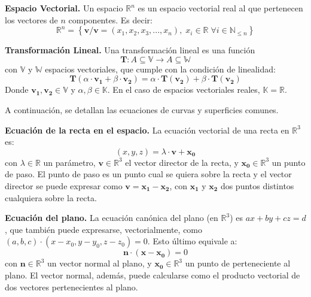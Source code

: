 \begin{definition}\textbf{Espacio Vectorial.}
    Un espacio $\mathbb{R}^n$ es un espacio vectorial real al que pertenecen
    los vectores de $n$ componentes. Es decir:
    \begin{equation*}
        \mathbb{R}^n = \left\{ \boldsymbol{v} / \boldsymbol{v}=(x_1,x_2,x_3,...,x_n), \; x_i \in \mathbb{R} \;\forall i \in \mathbb{N}_{\leq n} \right\}
    \end{equation*}
\end{definition}
\begin{definition}\textbf{Transformación Lineal.}
    Una transformación lineal es una función 
    \begin{equation*}
        \boldsymbol{T}:A\subseteq \mathbb{V} \rightarrow A\subseteq \mathbb{W}
    \end{equation*}
    con $\mathbb{V}$ y $\mathbb{W}$ espacios vectoriales, que cumple con la condición de linealidad:
    \begin{equation*}
        \boldsymbol{T}(\alpha \cdot \boldsymbol{v_1} + \beta \cdot \boldsymbol{v_2})=\alpha \cdot \boldsymbol{T}(\boldsymbol{v_2}) + \beta \cdot \boldsymbol{T}(\boldsymbol{v_2})
    \end{equation*}
    Donde $\boldsymbol{v_1},\boldsymbol{v_2} \in \mathbb{V}$ y $\alpha,\beta \in \mathbb{K}$. En el caso de espacios vectoriales reales,
    $\mathbb{K} = \mathbb{R}$.
\end{definition}
A continuación, se detallan las ecuaciones de curvas y superficies comunes.
\begin{definition}\textbf{Ecuación de la recta en el espacio.}
    La ecuación vectorial de una recta en $\mathbb{R}^3$ es:
    \begin{equation*}
        (x,y,z) = \lambda \cdot \boldsymbol{v} + \boldsymbol{x_0}
    \end{equation*}
    con $\lambda\in\mathbb{R}$ un parámetro, $\boldsymbol{v}\in\mathbb{R}^3$ el vector director de la recta,
    y $\boldsymbol{x_0}\in\mathbb{R}^3$ un punto de paso. El punto de paso es un punto cual se quiera
    sobre la recta y el vector director se puede expresar como $\boldsymbol{v}=\boldsymbol{x_1}-\boldsymbol{x_2}$, 
    con $\boldsymbol{x_1}$ y $\boldsymbol{x_2}$ dos puntos distintos cualquiera sobre la recta.
\end{definition}
\begin{definition}\textbf{Ecuación del plano.}
    La ecuación canónica del plano (en $\mathbb{R}^3$) es $ax+by+cz=d$, que también puede expresarse,
    vectorialmente, como $(a,b,c)\cdot(x-x_0,y-y_0,z-z_0)=0$. Esto último equivale a:
    \begin{equation*}
        \boldsymbol{n}\cdot(\boldsymbol{x} - \boldsymbol{x_0})=0
    \end{equation*}
    con $\boldsymbol{n}\in\mathbb{R}^3$ un vector normal al plano, y $\boldsymbol{x_0}\in\mathbb{R}^3$
    un punto de perteneciente al plano. El vector normal, además, puede calcularse como el producto vectorial
    de dos vectores pertenecientes al plano.
\end{definition}
